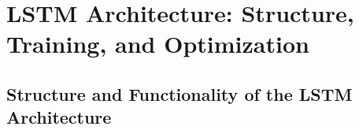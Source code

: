 \section{LSTM Architecture: Structure, Training, and Optimization}

\subsection{Structure and Functionality of the LSTM Architecture}